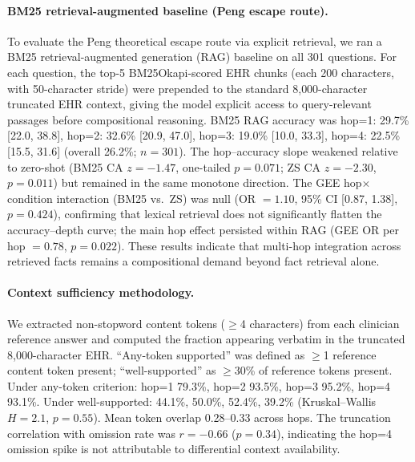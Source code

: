\documentclass{article}
\begin{document}
\paragraph{BM25 retrieval-augmented baseline (Peng escape route).}
\label{app:bm25_rag}
To evaluate the Peng theoretical escape route via explicit retrieval, we ran a BM25 retrieval-augmented generation (RAG) baseline on all 301 questions. For each question, the top-5 BM25Okapi-scored EHR chunks (each 200 characters, with 50-character stride) were prepended to the standard 8{,}000-character truncated EHR context, giving the model explicit access to query-relevant passages before compositional reasoning. BM25 RAG accuracy was hop=1: 29.7\% [22.0, 38.8], hop=2: 32.6\% [20.9, 47.0], hop=3: 19.0\% [10.0, 33.3], hop=4: 22.5\% [15.5, 31.6] (overall 26.2\%; $n = 301$). The hop--accuracy slope weakened relative to zero-shot (BM25 CA $z = -1.47$, one-tailed $p = 0.071$; ZS CA $z = -2.30$, $p = 0.011$) but remained in the same monotone direction. The GEE hop$\times$condition interaction (BM25 vs.\ ZS) was null (OR $= 1.10$, 95\% CI [0.87, 1.38], $p = 0.424$), confirming that lexical retrieval does not significantly flatten the accuracy--depth curve; the main hop effect persisted within RAG (GEE OR per hop $= 0.78$, $p = 0.022$). These results indicate that multi-hop integration across retrieved facts remains a compositional demand beyond fact retrieval alone.

\paragraph{Context sufficiency methodology.}
\label{app:context_sufficiency}
We extracted non-stopword content tokens ($\geq$4 characters) from each clinician
reference answer and computed the fraction appearing verbatim in the truncated
8,000-character EHR. ``Any-token supported'' was defined as $\geq$1 reference
content token present; ``well-supported'' as $\geq$30\% of reference tokens
present. Under any-token criterion: hop=1 79.3\%, hop=2 93.5\%, hop=3 95.2\%,
hop=4 93.1\%. Under well-supported: 44.1\%, 50.0\%, 52.4\%, 39.2\%
(Kruskal--Wallis $H = 2.1$, $p = 0.55$). Mean token overlap 0.28--0.33 across
hops. The truncation correlation with omission rate was $r = -0.66$ ($p = 0.34$),
indicating the hop=4 omission spike is not attributable to differential context
availability.
\end{document}
